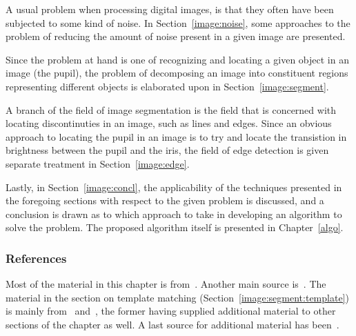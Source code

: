 A usual problem when processing digital images, is that they often
have been subjected to some kind of noise.  In
Section~\ref{image:noise}, some approaches to the problem of reducing
the amount of noise present in a given image are presented.  

Since the problem at hand is one of recognizing and locating a given
object in an image (the pupil), the problem of decomposing an image
into constituent regions representing different objects is elaborated
upon in Section~\ref{image:segment}.  

A branch of the field of image segmentation is the field that is
concerned with locating discontinuties in an image, such as lines and
edges.  Since an obvious approach to locating the pupil in an image is
to try and locate the transistion in brightness between the pupil and
the iris, the field of edge detection is given separate treatment in
Section~\ref{image:edge}.  

Lastly, in Section~\ref{image:concl}, the applicability of the
techniques presented in the foregoing sections with respect to the
given problem is discussed, and a conclusion is drawn as to which
approach to take in developing an algorithm to solve the problem.  The
proposed algorithm itself is presented in Chapter~\ref{algo}.

\subsubsection{References}

Most of the material in this chapter is from~\cite{digim}.  Another
main source is~\cite{digpic}.  The material in the section on template
matching (Section~\ref{image:segment:template}) is mainly
from~\cite{digpat} and~\cite{template}, the former having supplied
additional material to other sections of the chapter as well.  A last
source for additional material has been~\cite{digbild}.
